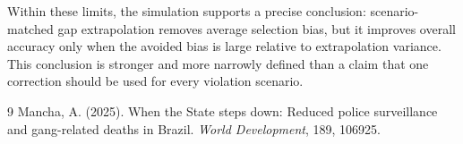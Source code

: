 \documentclass[11pt,a4paper]{article}
\begin{document}
Within these limits, the simulation supports a precise conclusion: scenario-matched gap extrapolation removes average selection bias, but it improves overall accuracy only when the avoided bias is large relative to extrapolation variance. This conclusion is stronger and more narrowly defined than a claim that one correction should be used for every violation scenario.



\begin{thebibliography}{9}
Mancha, A. (2025).
When the State steps down: Reduced police surveillance and gang-related deaths in Brazil.
\emph{World Development}, 189, 106925.
\end{thebibliography}
\end{document}
